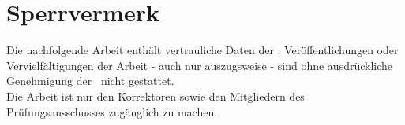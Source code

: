 \chapter*{Sperrvermerk}
	Die nachfolgende Arbeit enth{\"a}lt vertrauliche Daten der \companyname. Ver{\"o}ffentlichungen oder Vervielf{\"a}ltigungen der Arbeit - auch nur auszugsweise - sind ohne ausdr{\"u}ckliche Genehmigung der \companyname~nicht gestattet.\\
	Die Arbeit ist nur den Korrektoren sowie den Mitgliedern des Pr{\"u}fungsausschusses zug{\"a}nglich zu machen.
